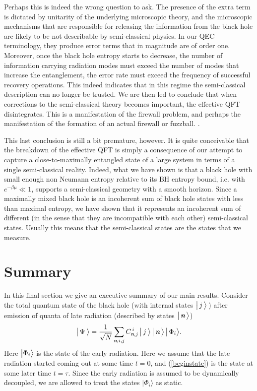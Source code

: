 \documentclass[12pt]{article}%
\def\be{\begin{equation}}
\def\ee{\end{equation}}
\begin{document}
 
Perhaps this is indeed the wrong question to ask.  The presence of the extra term is dictated by unitarity of
the underlying microscopic theory, and the microscopic mechanisms that are responsible for releasing the information from the black hole 
are likely to be not describable by semi-classical physics. In our QEC terminology, they produce error terms that in magnitude 
are of order one. Moreover, once the black hole entropy starts to decrease, the number 
of information carrying radiation modes must exceed the number of modes that increase the entanglement, the error rate  must
exceed the frequency of successful recovery operations. This indeed indicates that in this regime the semi-classical description can no longer be trusted.  
We are then led to conclude that when corrections to the semi-classical theory  becomes important,
the effective QFT disintegrates. 
This is a manifestation of the firewall problem, and perhaps the manifestation of the formation of an actual firewall or fuzzball. \cite{mathur-fuzzball-review}. 


This last conclusion is still a bit premature, however. It is quite conceivable that the breakdown of the effective QFT is simply a consequence of
our attempt to capture a close-to-maximally entangled state of a large system in terms of a single semi-classical reality. Indeed, what we have
shown is that a black hole with small enough non Neumann entropy relative to its BH entropy bound,  i.e. with $e^{-\beta\mu}\ll1$, supports 
a semi-classical geometry with a smooth horizon. Since a maximally mixed black hole is an incoherent sum of black hole states with less than 
maximal entropy, we have shown that it represents an incoherent sum of different (in the sense that they are incompatible with each other) semi-classical states. 
Usually this means that the semi-classical states are the states that we measure.

\newpage

\section{Summary}

In this final section we give an executive summary of our main results. Consider the total quantum state of the black hole (with internal states $\bigl| \,j\, \bigr\rangle \,$) after emission of quanta of late radiation (described by states $\bigl| \,{ \textit{\textbf n}}\, \bigr\rangle$) 
\be
\label{beginstate}
\bigl|\,\Psi \,\bigr\rangle ={1\over\sqrt{N}}\sum_{\nom,i, j} C^{\,i}_{\nom, j} \,\bigl| \,j\,\bigr \rangle \,\bigl| \,\nom\,\bigr \rangle\, \bigl| \,\Phi_i\bigr \rangle. 
\ee
Here $\bigl|\Phi_i\bigr\rangle$ is the state of the  early radiation. Here we assume that the late radiation started
coming out at some time $t=0$, and (\ref{beginstate}) is the state at some later time $t =\tau$. Since the early radiation is assumed to be dynamically
decoupled, we are allowed to treat the states $\bigl|\Phi_i\bigr\rangle$ as static.
\end{document}
